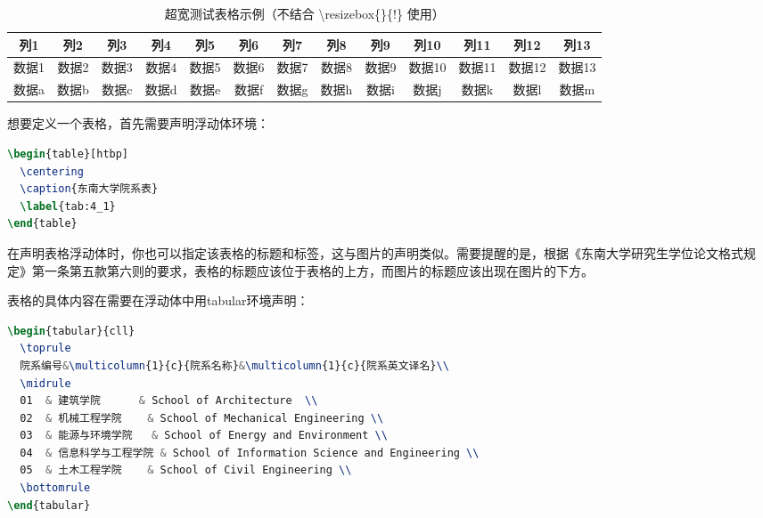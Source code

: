 \begin{table}[htbp]
\centering
\caption{超宽测试表格示例（不结合 \textbackslash resizebox\{\textwidth\}\{!\} 使用）}
\label{tab:4_wide2}
\begin{tabular}{ccccccccccccc}
\toprule
列1 & 列2 & 列3 & 列4 & 列5 & 列6 & 列7 & 列8 & 列9 & 列10 & 列11 & 列12 & 列13 \\
\midrule
数据1 & 数据2 & 数据3 & 数据4 & 数据5 & 数据6 & 数据7 & 数据8 & 数据9 & 数据10 & 数据11 & 数据12 & 数据13 \\
数据a & 数据b & 数据c & 数据d & 数据e & 数据f & 数据g & 数据h & 数据i & 数据j & 数据k & 数据l & 数据m \\
\bottomrule
\end{tabular}
\end{table}


\noindent 想要定义一个表格，首先需要声明浮动体环境：

\begin{tcolorbox}
\begin{lstlisting}[language=TeX]
\begin{table}[htbp]
  \centering
  \caption{东南大学院系表}
  \label{tab:4_1}
\end{table}
\end{lstlisting}
\end{tcolorbox}

\noindent 在声明表格浮动体时，你也可以指定该表格的标题和标签，这与图片的声明类似。需要提醒的是，根据《东南大学研究生学位论文格式规定》\cite{seugs2015rule}第一条第五款第六则的要求，表格的标题应该位于表格的上方，而图片的标题应该出现在图片的下方。

表格的具体内容在需要在浮动体中用{\codefont tabular}环境声明：

\begin{tcolorbox}
\begin{lstlisting}[language=TeX]
\begin{tabular}{cll}
  \toprule
  院系编号&\multicolumn{1}{c}{院系名称}&\multicolumn{1}{c}{院系英文译名}\\
  \midrule
  01  & 建筑学院      & School of Architecture  \\
  02  & 机械工程学院    & School of Mechanical Engineering \\
  03  & 能源与环境学院   & School of Energy and Environment \\
  04  & 信息科学与工程学院 & School of Information Science and Engineering \\
  05  & 土木工程学院    & School of Civil Engineering \\
  \bottomrule
\end{tabular}
\end{lstlisting}
\end{tcolorbox}

